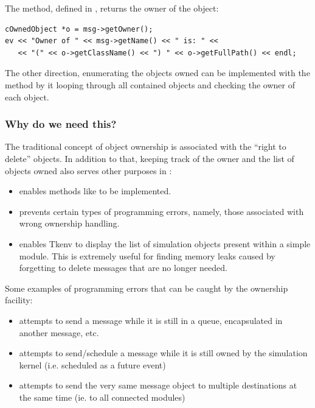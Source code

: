 The  method, defined in , returns the
owner of the object:

\begin{verbatim}
cOwnedObject *o = msg->getOwner();
ev << "Owner of " << msg->getName() << " is: " <<
   << "(" << o->getClassName() << ") " << o->getFullPath() << endl;
\end{verbatim}

The other direction, enumerating the objects owned can be implemented with
the  method by it looping through all
contained objects and checking the owner of each object.

\subsubsection{Why do we need this?}

The traditional concept of object ownership is associated with
the ``right to delete'' objects. In addition to that,
keeping track of the owner and the list of objects owned also
serves other purposes in {\opp}:

\begin{itemize}
    \item{enables methods like  to be implemented.}

    \item{prevents certain types of programming errors, namely,
    those associated with wrong ownership handling.}

    \item{enables Tkenv to display the list of simulation objects
    present within a simple module. This is extremely useful for finding
    memory leaks caused by forgetting to delete messages that are
    no longer needed.}
\end{itemize}

Some examples of programming errors that can be caught
by the ownership facility:

\begin{itemize}
    \item{attempts to send a message while it is still in a queue,
    encapsulated in another message, etc.}

    \item{attempts to send/schedule a message while it is still owned
    by the simulation kernel (i.e. scheduled as a future event)}

    \item{attempts to send the very same message object to multiple
    destinations at the same time (ie. to all connected modules)}
\end{itemize}

